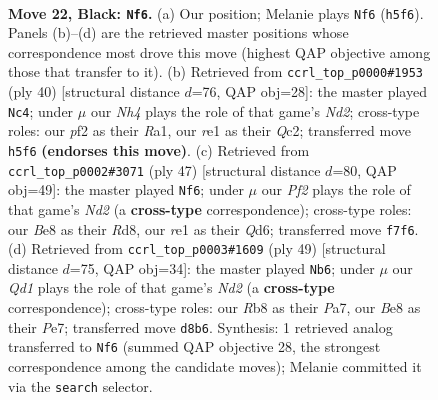 \documentclass[11pt]{article}
\begin{document}
\clearpage

\begin{figure}[p]\centering
\begin{subfigure}{0.46\textwidth}\centering
\resizebox{\linewidth}{!}{%
\newchessgame
\chessboard[
  setfen={rr1qb1k1/p4ppp/B7/p2p3n/3Q2PP/1P3N2/P4P2/R3R1K1 b - - 0 22},
  showmover=false,
  pgfstyle=straightmove, color=movearrow, markmove={h5-f6}
]}
\caption{}
\end{subfigure}\hfill
\begin{subfigure}{0.46\textwidth}\centering
\resizebox{\linewidth}{!}{%
\newchessgame
\chessboard[
  setfen={r4rk1/1ppq1pp1/6np/3Pp3/1b2P3/4R2P/PBQN1PP1/R5K1 w - - 0 21},
  showmover=false,
  pgfstyle=straightmove, color=movearrow, markmove={d2-c4}
]}
\caption{}
\end{subfigure}
\\[4pt]
\begin{subfigure}{0.46\textwidth}\centering
\resizebox{\linewidth}{!}{%
\newchessgame
\chessboard[
  setfen={r2r2k1/3n1ppp/2pq4/pb1p4/3Q1P2/2N3PB/PPP4P/2KRR3 b - - 7 24},
  showmover=false,
  pgfstyle=straightmove, color=movearrow, markmove={d7-f6}
]}
\caption{}
\end{subfigure}\hfill
\begin{subfigure}{0.46\textwidth}\centering
\resizebox{\linewidth}{!}{%
\newchessgame
\chessboard[
  setfen={1r1r2k1/p2npp1p/2q3p1/2pb4/4N2P/2Q2PP1/PPP5/2KRRB2 b - - 2 25},
  showmover=false,
  pgfstyle=straightmove, color=movearrow, markmove={d7-b6}
]}
\caption{}
\end{subfigure}
\caption{\textbf{Move 22, Black: \texttt{Nf6}.} (a) Our position; Melanie plays \texttt{Nf6} (\texttt{h5f6}). Panels (b)--(d) are the retrieved master positions whose correspondence most drove this move (highest QAP objective among those that transfer to it). (b) Retrieved from \texttt{ccrl\_top\_p0000\#1953} (ply 40) [structural distance $d$=76, QAP obj=28]: the master played \texttt{Nc4}; under $\mu$ our \emph{Nh4} plays the role of that game's \emph{Nd2}; cross-type roles: our \emph{p}f2 as their \emph{R}a1, our \emph{r}e1 as their \emph{Q}c2; transferred move \texttt{h5f6} \textbf{(endorses this move)}. (c) Retrieved from \texttt{ccrl\_top\_p0002\#3071} (ply 47) [structural distance $d$=80, QAP obj=49]: the master played \texttt{Nf6}; under $\mu$ our \emph{Pf2} plays the role of that game's \emph{Nd2} (a \textbf{cross-type} correspondence); cross-type roles: our \emph{B}e8 as their \emph{R}d8, our \emph{r}e1 as their \emph{Q}d6; transferred move \texttt{f7f6}. (d) Retrieved from \texttt{ccrl\_top\_p0003\#1609} (ply 49) [structural distance $d$=75, QAP obj=34]: the master played \texttt{Nb6}; under $\mu$ our \emph{Qd1} plays the role of that game's \emph{Nd2} (a \textbf{cross-type} correspondence); cross-type roles: our \emph{R}b8 as their \emph{P}a7, our \emph{B}e8 as their \emph{P}e7; transferred move \texttt{d8b6}. Synthesis: 1 retrieved analog transferred to \texttt{Nf6} (summed QAP objective 28, the strongest correspondence among the candidate moves); Melanie committed it via the \texttt{search} selector.}
\label{fig:thought-m43}
\end{figure}
\end{document}
